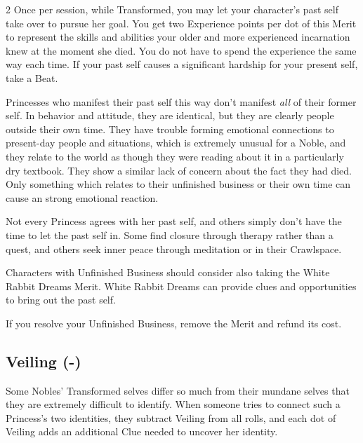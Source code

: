 \begin{multicols}{2}
Once per session, while Transformed, you may let your character's past self take over to pursue her goal. You get two Experience points per dot of this Merit to represent the skills and abilities your older and more experienced incarnation knew at the moment she died. You do not have to spend the experience the same way each time. If your past self causes a significant hardship for your present self, take a Beat.

Princesses who manifest their past self this way don't manifest \textit{all} of their former self. In behavior and attitude, they are identical, but they are clearly people outside their own time. They have trouble forming emotional connections to present-day people and situations, which is extremely unusual for a Noble, and they relate to the world as though they were reading about it in a particularly dry textbook. They show a similar lack of concern about the fact they had died. Only something which relates to their unfinished business or their own time can cause an strong emotional reaction.

Not every Princess agrees with her past self, and others simply don't have the time to let the past self in. Some find closure through therapy rather than a quest, and others seek inner peace through meditation or in their Crawlspace.

Characters with Unfinished Business should consider also taking the White Rabbit Dreams Merit. White Rabbit Dreams can provide clues and opportunities to bring out the past self. 

If you resolve your Unfinished Business, remove the Merit and refund its cost. 

\subsection*{Veiling (\textbullet\nobreak\hspace{.16667em}-\nobreak\hspace{.16667em}\textbullet\textbullet\textbullet)}

Some Nobles' Transformed selves differ so much from their mundane selves that they are extremely difficult to identify. When someone tries to connect such a Princess's two identities, they subtract Veiling from all rolls, and each dot of Veiling adds an additional Clue needed to uncover her identity. 


\end{multicols}
